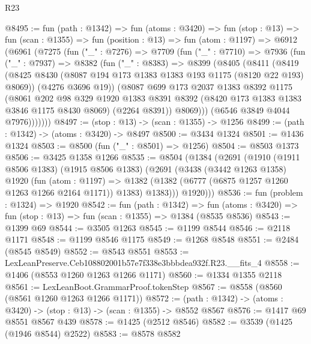 \begin{lexlean}{R23}
\begin{coremodule}
@8495 := fun (path : @1342) =>
  fun (atoms : @3420) =>
  fun (stop : @13) =>
  fun (scan : @1355) =>
  fun (position : @13) =>
  fun (atom : @1197) =>
  @6912
    (@6961
      (@7275
        (fun ("_" : @7276) =>
        @7709
          (fun ("_" : @7710) =>
          @7936
            (fun ("_" : @7937) =>
            @8382
              (fun ("_" : @8383) =>
              @8399
                (@8405
                  (@8411
                    (@8419
                      (@8425 @8430 (@8087 @194 @173 @1383 @1383 @193 @1175 (@8120 @22 @193) @8069))
                      (@4276 @3696 @19))
                    (@8087
                      @699
                      @173
                      @2037
                      @1383
                      @8392
                      @1175
                      (@8061
                        @202
                        @98
                        @329
                        @1920
                        @1383
                        @8391
                        @8392
                        (@8420 @173 @1383 @1383 @3846 @1175 @8430 @8069)
                        (@2264 @8391))
                      @8069)))
                (@6546 @3849 @4044 @7976)))))))
@8497 := (stop : @13) -> (scan : @1355) -> @1256
@8499 := (path : @1342) -> (atoms : @3420) -> @8497
@8500 := @3434 @1324
@8501 := @1436 @1324
@8503 := @8500 (fun ("_" : @8501) => @1256)
@8504 := @8503 @1373
@8506 := @3425 @1358 @1266
@8535 := @8504
    (@1384
      (@2691
        (@1910
          (@1911 @8506 @1383)
          (@1915 @8506 @1383)
          (@2691
            (@3438
              (@3442 @1263 @1358)
              @1920
              (fun (atom : @1197) =>
              @1382 (@1382 (@6777 (@6875 @1257 @1260 @1263 @1266 @2164 @1171)) @1383) @1383)))
          @1920)))
@8536 := fun (problem : @1324) => @1920
@8542 := fun (path : @1342) =>
  fun (atoms : @3420) => fun (stop : @13) => fun (scan : @1355) => @1384 (@8535 @8536)
@8543 := @1399 @69
@8544 := @3505 @1263
@8545 := @1199 @8544
@8546 := @2118 @1171
@8548 := @1199 @8546 @1175
@8549 := @1268 @8548
@8551 := @2484 (@8545 @8549)
@8552 := @8543 @8551
@8553 := LexLeanPreserve.Ceb108802001b57e7f338e3bbbdea932f.R23.__fits_4
@8558 := @1406 (@8553 @1260 @1263 @1266 @1171)
@8560 := @1334 @1355 @2118
@8561 := LexLeanBoot.GrammarProof.tokenStep
@8567 := @8558 (@8560 (@8561 @1260 @1263 @1266 @1171))
@8572 := (path : @1342) -> (atoms : @3420) -> (stop : @13) -> (scan : @1355) -> @8552 @8567
@8576 := @1417 @69 @8551 @8567 @439
@8578 := @1425 (@2512 @8546)
@8582 := @3539 (@1425 (@1946 @8544) @2522)
@8583 := @8578 @8582

\end{coremodule}
\end{lexlean}

